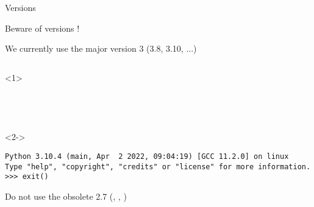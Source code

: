\begin{frame}[fragile]{Versions}

   Beware of versions !

   We currently use the major version 3 (3.8, 3.10, ...)

  \begin{columns}[onlytextwidth]
    \begin{column}{\textwidth}

      \begin{onlyenv}<1>
        \begin{lstlisting}[style=sh]
%*\LSTPrompt*) python3




 \end{lstlisting}
      \end{onlyenv}

      \begin{onlyenv}<2->
        \begin{lstlisting}[style=sh]
%*\LSTPrompt*) python3
Python 3.10.4 (main, Apr  2 2022, 09:04:19) [GCC 11.2.0] on linux
Type "help", "copyright", "credits" or "license" for more information.
>>> exit() \end{lstlisting}
      \end{onlyenv}

     Do not use the obsolete 2.7 (, , )

    \end{column}
  \end{columns}
\end{frame}


